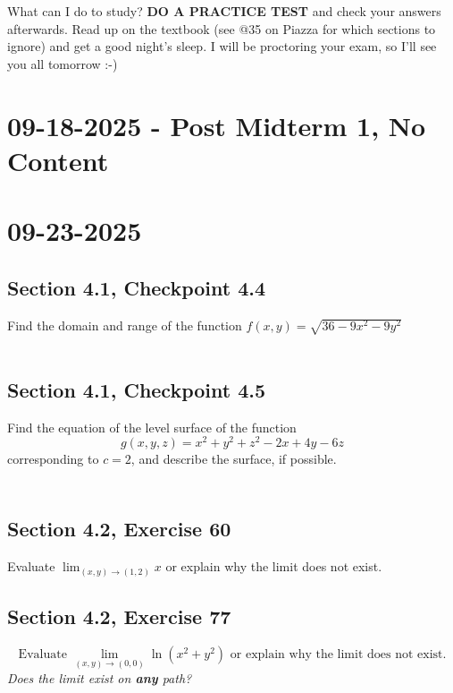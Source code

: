 \documentclass[]{mangos-musings}
\begin{document}
What can I do to study?
\textbf{DO A PRACTICE TEST} and check your answers afterwards. Read up on the textbook (see @35 on Piazza for which sections to ignore) and get a good night's sleep. I will be proctoring your exam, so I'll see you all tomorrow :-)

\newpage
\section{09-18-2025 - Post Midterm 1, No Content}

\newpage
\section{09-23-2025}
\subsection{Section 4.1, Checkpoint 4.4}
Find the domain and range of the function $f(x, y) = \sqrt{36 - 9x^2 - 9y^2}$
\begin{align*}
  \\ \\
\end{align*}
\subsection{Section 4.1, Checkpoint 4.5}
Find the equation of the level surface of the function 
\[g(x, y, z) = x^2 + y^2 + z^2 - 2x + 4y - 6z\]
corresponding to $c = 2$, and describe the surface, if possible.
\begin{align*}
  \\ \\ \\
\end{align*}
\subsection{Section 4.2, Exercise 60}
Evaluate $\lim_{(x, y)\to(1, 2)}x$  or explain why the limit does not exist.

\subsection{Section 4.2, Exercise 77}
\[\text{Evaluate } \lim_{(x, y)\to(0, 0)}\ln (x^2 + y^2) \text{ or explain why the limit does not exist.} \]
\textit{Does the limit exist on \textbf{any} path?}
\begin{align*}
  \\
\end{align*}
\end{document}

